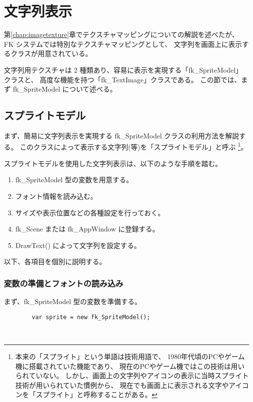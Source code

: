 \chapter{文字列表示} \label{chap:stringimage}
第\ref{chap:imagetexture}章でテクスチャマッピングについての解説を述べたが、
FK システムでは特別なテクスチャマッピングとして、
文字列を画面上に表示するクラスが用意されている。

文字列用テクスチャは 2 種類あり、容易に表示を実現する「fk\_SpriteModel」クラスと、
高度な機能を持つ「fk\_TextImage」クラスである。
この節では、まず fk\_SpriteModel について述べる。

\section{スプライトモデル}
まず、簡易に文字列表示を実現する fk\_SpriteModel クラスの利用方法を解説する。
このクラスによって表示する文字列(等)を「スプライトモデル」と呼ぶ
\footnote{本来の「スプライト」という単語は技術用語で、
1980年代頃のPCやゲーム機に搭載されていた機能であり、
現在のPCやゲーム機ではこの技術は用いられていない。
しかし、画面上の文字列やアイコンの表示に当時スプライト技術が用いられていた慣例から、
現在でも画面上に表示される文字やアイコンを「スプライト」と呼称することがある。}。

スプライトモデルを使用した文字列表示は、以下のような手順を踏む。
\begin{enumerate}
 \item fk\_SpriteModel 型の変数を用意する。
 \item フォント情報を読み込む。
 \item サイズや表示位置などの各種設定を行っておく。
 \item fk\_Scene または fk\_AppWindow に登録する。
 \item DrawText() によって文字列を設定する。
\end{enumerate}

以下、各項目を個別に説明する。

\subsection{変数の準備とフォントの読み込み} \label{subsec:initFont}
まず、fk\_SpriteModel 型の変数を準備する。
\\
\begin{screen}
\begin{verbatim}
        var sprite = new fk_SpriteModel();
\end{verbatim}
\end{screen}
~

